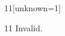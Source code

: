 \documentclass[paper=A4]{ropas-poster}
\begin{document}
\begin{postergrid}{1}{1}[unknown=1]
\begin{posterblock}{1}{1}
Invalid.
\end{posterblock}
\end{postergrid}
\end{document}
